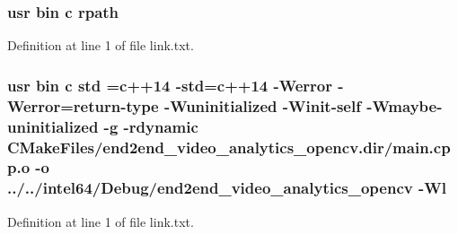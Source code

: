 \subsubsection[{\texorpdfstring{rpath}{rpath}}]{\setlength{\rightskip}{0pt plus 5cm}usr bin {\bf c} rpath}\hypertarget{end2end__video__analytics_2end2end__video__analytics__opencv_2CMakeFiles_2end2end__video__analytics__opencv_8dir_2link_8txt_ab9d7fd7120fafa2118a4e08c1df697c7}{}\label{end2end__video__analytics_2end2end__video__analytics__opencv_2CMakeFiles_2end2end__video__analytics__opencv_8dir_2link_8txt_ab9d7fd7120fafa2118a4e08c1df697c7}


Definition at line 1 of file link.\+txt.

\subsubsection[{\texorpdfstring{std}{std}}]{\setlength{\rightskip}{0pt plus 5cm}usr bin {\bf c} std ={\bf c}++14 -\/std={\bf c}++14 -\/Werror -\/Werror=return-\/type -\/Wuninitialized -\/Winit-\/self -\/Wmaybe-\/uninitialized -\/g -\/rdynamic C\+Make\+Files/end2end\+\_\+video\+\_\+analytics\+\_\+opencv.\+dir/main.\+cpp.\+o -\/o ../../intel64/Debug/end2end\+\_\+video\+\_\+analytics\+\_\+opencv -\/{\bf Wl}}\hypertarget{end2end__video__analytics_2end2end__video__analytics__opencv_2CMakeFiles_2end2end__video__analytics__opencv_8dir_2link_8txt_a1ccfea5f558575a112db71eeb271fabf}{}\label{end2end__video__analytics_2end2end__video__analytics__opencv_2CMakeFiles_2end2end__video__analytics__opencv_8dir_2link_8txt_a1ccfea5f558575a112db71eeb271fabf}


Definition at line 1 of file link.\+txt.


